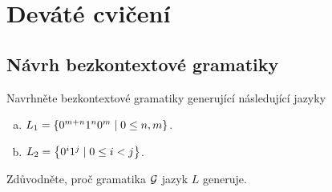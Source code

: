 \setlength{\abovedisplayskip}{0pt}
\setlength{\belowdisplayskip}{0pt}
\setlength{\abovedisplayshortskip}{0pt}
\setlength{\belowdisplayshortskip}{0pt}

\section{Deváté cvičení}
\subsection{Návrh bezkontextové gramatiky}
Navrhněte bezkontextové gramatiky generující následující jazyky
\begin{enumerate}[a), noitemsep]
    \item $L_1 = \left\lbrace 0^{m+n} 1^n 0^m \mid 0 \leq n,m \right\rbrace$.
    \item $L_2 = \left\lbrace 0^i 1^j \mid 0 \leq i < j \right\rbrace$.
\end{enumerate}
Zdůvodněte, proč gramatika $\mathcal{G}$ jazyk $L$ generuje.

